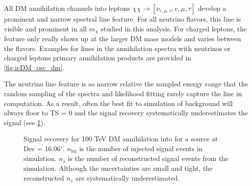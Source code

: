 All DM annihilation channels into leptons $ \chi\chi \rightarrow [\nu_{e, \mu, \tau}, e, \mu,\tau] $ develop a prominent and narrow spectral line feature.
For all neutrino flavors, this line is visible and prominent in all $m_\chi$ studied in this analysis.
For charged leptons, the feature only really shows up at the larger DM mass models and varies between the flavors.
Examples for lines in the annihilation spectra with neutrinos or charged leptons primary annihilation products are provided in \cref{fig:icDM_osc_dm}.

The neutrino line feature is so narrow relative the sampled energy range that the random sampling of the spectra and likelihood fitting rarely capture the line in computation.
As a result, often the best fit to simulation of background will always floor to TS = 0 and the signal recovery systematically underestimates the signal (see \cref{fig:sig_recovery_fail}).

\begin{figure}[t]
    \caption{Signal recovery for 100 TeV DM annihilation into \parpar{\nu_\mu} for a source at Dec = 16.06$^\circ$. $n_\mathrm{inj}$ is the number of injected signal events in simulation. $n_s$ is the number of reconstructed signal events from the simulation. Although the uncertainties are small and tight, the reconstructed $ n_s $ are systematically underestimated.} \label{fig:sig_recovery_fail}
\end{figure}


